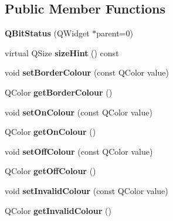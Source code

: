 \subsection*{Public Member Functions}
\begin{DoxyCompactItemize}
\item 
\hypertarget{classQBitStatus_aa1ee5c973e2e4faf631af5482d1e9b23}{
{\bfseries QBitStatus} (QWidget $\ast$parent=0)}
\label{classQBitStatus_aa1ee5c973e2e4faf631af5482d1e9b23}

\item 
\hypertarget{classQBitStatus_ab86a3fa5269f0c8c323760854b664936}{
virtual QSize {\bfseries sizeHint} () const }
\label{classQBitStatus_ab86a3fa5269f0c8c323760854b664936}

\item 
\hypertarget{classQBitStatus_a838deda1985bf1b571ae81ff8703df42}{
void {\bfseries setBorderColour} (const QColor value)}
\label{classQBitStatus_a838deda1985bf1b571ae81ff8703df42}

\item 
\hypertarget{classQBitStatus_a80f019317890fb253efbc848b5dfc65e}{
QColor {\bfseries getBorderColour} ()}
\label{classQBitStatus_a80f019317890fb253efbc848b5dfc65e}

\item 
\hypertarget{classQBitStatus_aee0fbfcc1c3738a1cfcda836aaf7ff30}{
void {\bfseries setOnColour} (const QColor value)}
\label{classQBitStatus_aee0fbfcc1c3738a1cfcda836aaf7ff30}

\item 
\hypertarget{classQBitStatus_a5df9c668db8d8eea89c6402c7d2bd452}{
QColor {\bfseries getOnColour} ()}
\label{classQBitStatus_a5df9c668db8d8eea89c6402c7d2bd452}

\item 
\hypertarget{classQBitStatus_a701b5de6d118101bd6d1bee41e8173e8}{
void {\bfseries setOffColour} (const QColor value)}
\label{classQBitStatus_a701b5de6d118101bd6d1bee41e8173e8}

\item 
\hypertarget{classQBitStatus_a8a5a346f467ea7865233682a4cbb5320}{
QColor {\bfseries getOffColour} ()}
\label{classQBitStatus_a8a5a346f467ea7865233682a4cbb5320}

\item 
\hypertarget{classQBitStatus_aee06e37544e37c8227e33047497fc5db}{
void {\bfseries setInvalidColour} (const QColor value)}
\label{classQBitStatus_aee06e37544e37c8227e33047497fc5db}

\item 
\hypertarget{classQBitStatus_a36c7505267e0d915156fcd1c62c5d75f}{
QColor {\bfseries getInvalidColour} ()}
\label{classQBitStatus_a36c7505267e0d915156fcd1c62c5d75f}


\end{DoxyCompactItemize}
